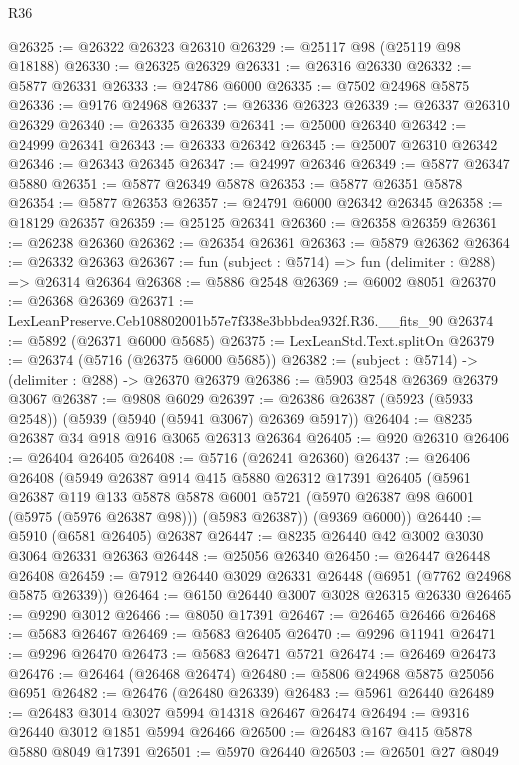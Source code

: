 \begin{lexlean}{R36}
\begin{coremodule}
@26325 := @26322 @26323 @26310
@26329 := @25117 @98 (@25119 @98 @18188)
@26330 := @26325 @26329
@26331 := @26316 @26330
@26332 := @5877 @26331
@26333 := @24786 @6000
@26335 := @7502 @24968 @5875
@26336 := @9176 @24968
@26337 := @26336 @26323
@26339 := @26337 @26310 @26329
@26340 := @26335 @26339
@26341 := @25000 @26340
@26342 := @24999 @26341
@26343 := @26333 @26342
@26345 := @25007 @26310 @26342
@26346 := @26343 @26345
@26347 := @24997 @26346
@26349 := @5877 @26347 @5880
@26351 := @5877 @26349 @5878
@26353 := @5877 @26351 @5878
@26354 := @5877 @26353
@26357 := @24791 @6000 @26342 @26345
@26358 := @18129 @26357
@26359 := @25125 @26341
@26360 := @26358 @26359
@26361 := @26238 @26360
@26362 := @26354 @26361
@26363 := @5879 @26362
@26364 := @26332 @26363
@26367 := fun (subject : @5714) => fun (delimiter : @288) => @26314 @26364
@26368 := @5886 @2548
@26369 := @6002 @8051
@26370 := @26368 @26369
@26371 := LexLeanPreserve.Ceb108802001b57e7f338e3bbbdea932f.R36.__fits_90
@26374 := @5892 (@26371 @6000 @5685)
@26375 := LexLeanStd.Text.splitOn
@26379 := @26374 (@5716 (@26375 @6000 @5685))
@26382 := (subject : @5714) -> (delimiter : @288) -> @26370 @26379
@26386 := @5903 @2548 @26369 @26379 @3067
@26387 := @9808 @6029
@26397 := @26386 @26387 (@5923 (@5933 @2548)) (@5939 (@5940 (@5941 @3067) @26369 @5917))
@26404 := @8235 @26387 @34 @918 @916 @3065 @26313 @26364
@26405 := @920 @26310
@26406 := @26404 @26405
@26408 := @5716 (@26241 @26360)
@26437 := @26406
    @26408
    (@5949
      @26387
      @914
      @415
      @5880
      @26312
      @17391
      @26405
      (@5961
        @26387
        @119
        @133
        @5878
        @5878
        @6001
        @5721
        (@5970 @26387 @98 @6001 (@5975 (@5976 @26387 @98)))
        (@5983 @26387))
      (@9369 @6000))
@26440 := @5910 (@6581 @26405) @26387
@26447 := @8235 @26440 @42 @3002 @3030 @3064 @26331 @26363
@26448 := @25056 @26340
@26450 := @26447 @26448 @26408
@26459 := @7912 @26440 @3029 @26331 @26448 (@6951 (@7762 @24968 @5875 @26339))
@26464 := @6150 @26440 @3007 @3028 @26315 @26330
@26465 := @9290 @3012
@26466 := @8050 @17391
@26467 := @26465 @26466
@26468 := @5683 @26467
@26469 := @5683 @26405
@26470 := @9296 @11941
@26471 := @9296 @26470
@26473 := @5683 @26471 @5721
@26474 := @26469 @26473
@26476 := @26464 (@26468 @26474)
@26480 := @5806 @24968 @5875 @25056 @6951
@26482 := @26476 (@26480 @26339)
@26483 := @5961 @26440
@26489 := @26483 @3014 @3027 @5994 @14318 @26467 @26474
@26494 := @9316 @26440 @3012 @1851 @5994 @26466
@26500 := @26483 @167 @415 @5878 @5880 @8049 @17391
@26501 := @5970 @26440
@26503 := @26501 @27 @8049

\end{coremodule}
\end{lexlean}
